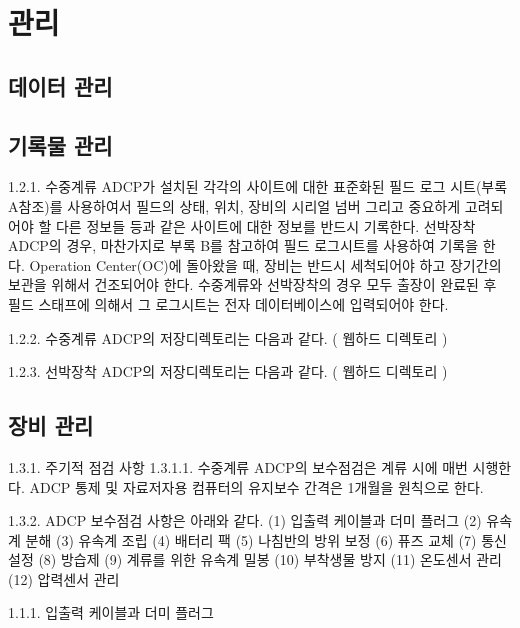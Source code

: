 \documentclass[
]{book}
\begin{document}
\hypertarget{uxad00uxb9ac-1}{%
\section{관리}\label{uxad00uxb9ac-1}}

\hypertarget{uxb370uxc774uxd130-uxad00uxb9ac-1}{%
\subsection{데이터 관리}\label{uxb370uxc774uxd130-uxad00uxb9ac-1}}

\hypertarget{uxae30uxb85duxbb3c-uxad00uxb9ac-1}{%
\subsection{기록물 관리}\label{uxae30uxb85duxbb3c-uxad00uxb9ac-1}}

1.2.1. 수중계류 ADCP가 설치된 각각의 사이트에 대한 표준화된 필드 로그 시트(부록 A참조)를 사용하여서 필드의 상태, 위치, 장비의 시리얼 넘버 그리고 중요하게 고려되어야 할 다른 정보들 등과 같은 사이트에 대한 정보를 반드시 기록한다. 선박장착 ADCP의 경우, 마찬가지로 부록 B를 참고하여 필드 로그시트를 사용하여 기록을 한다. Operation Center(OC)에 돌아왔을 때, 장비는 반드시 세척되어야 하고 장기간의 보관을 위해서 건조되어야 한다. 수중계류와 선박장착의 경우 모두 출장이 완료된 후 필드 스태프에 의해서 그 로그시트는 전자 데이터베이스에 입력되어야 한다.

1.2.2. 수중계류 ADCP의 저장디렉토리는 다음과 같다.
( 웹하드 디렉토리 )

1.2.3. 선박장착 ADCP의 저장디렉토리는 다음과 같다.
( 웹하드 디렉토리 )

\hypertarget{uxc7a5uxbe44-uxad00uxb9ac-1}{%
\subsection{장비 관리}\label{uxc7a5uxbe44-uxad00uxb9ac-1}}

1.3.1. 주기적 점검 사항
1.3.1.1. 수중계류 ADCP의 보수점검은 계류 시에 매번 시행한다. ADCP 통제 및 자료저자용 컴퓨터의 유지보수 간격은 1개월을 원칙으로 한다.

1.3.2. ADCP 보수점검 사항은 아래와 같다.
(1) 입출력 케이블과 더미 플러그
(2) 유속계 분해
(3) 유속계 조립
(4) 배터리 팩
(5) 나침반의 방위 보정
(6) 퓨즈 교체
(7) 통신 설정
(8) 방습제
(9) 계류를 위한 유속계 밀봉
(10) 부착생물 방지
(11) 온도센서 관리
(12) 압력센서 관리

1.1.1. 입출력 케이블과 더미 플러그
\end{document}

